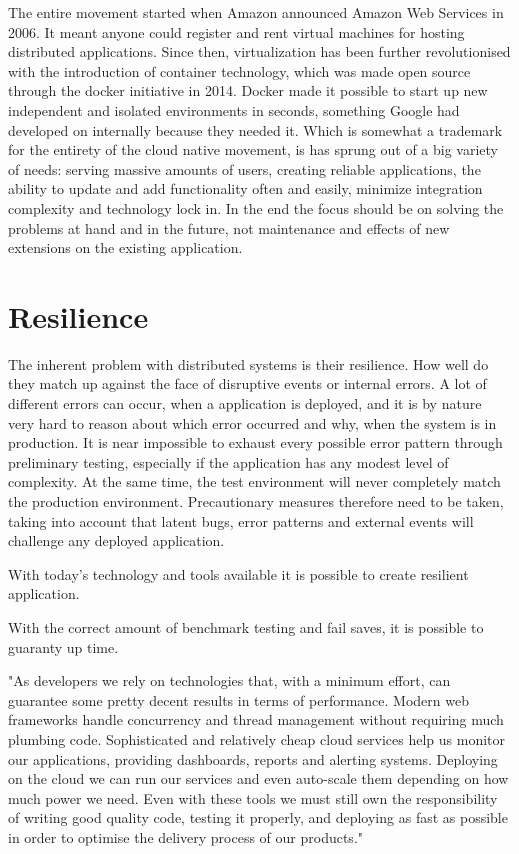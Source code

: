 The entire movement started when Amazon announced Amazon Web Services in 2006. It meant anyone could register and rent virtual machines for hosting distributed applications. Since then, virtualization has been further revolutionised with the introduction of container technology, which was made open source through the docker initiative in 2014. Docker made it possible to start up new independent and isolated environments in seconds, something Google had developed on internally because they needed it\cite{bernstein2014containers}. Which is somewhat a trademark for the entirety of the cloud native movement, is has sprung out of a big variety of needs: serving massive amounts of users, creating reliable applications, the ability to update and add functionality often and easily, minimize integration complexity and technology lock in. In the end the focus should be on solving the problems at hand and in the future, not maintenance and effects of new extensions on the existing application.


\section{Resilience}

The inherent problem with distributed systems is their resilience. How well do they match up against the face of disruptive events or internal errors. A lot of different errors can occur, when a application is deployed, and it is by nature very hard to reason about which error occurred and why, when the system is in production. It is near impossible to exhaust every possible error pattern through preliminary testing, especially if the application has any modest level of complexity. At the same time, the test environment will never completely match the production environment. Precautionary measures therefore need to be taken, taking into account that latent bugs, error patterns and external events will challenge any deployed application. 

With today's technology and tools available it is possible to create resilient application.

With the correct amount of benchmark testing and fail saves, it is possible to guaranty up time.

"As developers we rely on technologies that, with a minimum effort, can guarantee some pretty decent results in terms of performance. Modern web frameworks handle concurrency and thread management without requiring much plumbing code. Sophisticated and relatively cheap cloud services help us monitor our applications, providing dashboards, reports and alerting systems. Deploying on the cloud we can run our services and even auto-scale them depending on how much power we need. Even with these tools we must still own the responsibility of writing good quality code, testing it properly, and deploying as fast as possible in order to optimise the delivery process of our products."

